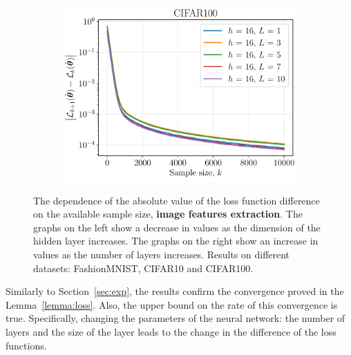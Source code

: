 \documentclass{article}
\begin{document}
\begin{figure}[ht]
\begin{subfigure}[b]{0.5\linewidth}
  \end{subfigure}%
  \begin{subfigure}[b]{0.5\linewidth}
    \centering
    \includegraphics[width=\linewidth]{figs_extraction/cifar100_num_layers.pdf} 
  \end{subfigure} 
  \caption{The dependence of the absolute value of the loss function difference on the available sample size, \textbf{image features extraction}. The graphs on the left show a decrease in values as the dimension of the hidden layer increases. The graphs on the right show an increase in values as the number of layers increases. Results on different datasets: FashionMNIST, CIFAR10 and CIFAR100.}
  \label{fig:additional-exp-extraction} 
\end{figure}

Similarly to Section~\ref{sec:exp}, the results confirm the convergence proved in the Lemma~\ref{lemma:loss}. Also, the upper bound on the rate of this convergence is true. Specifically, changing the parameters of the neural network: the number of layers and the size of the layer leads to the change in the difference of the loss functions.

\clearpage
\newpage
\end{document}
